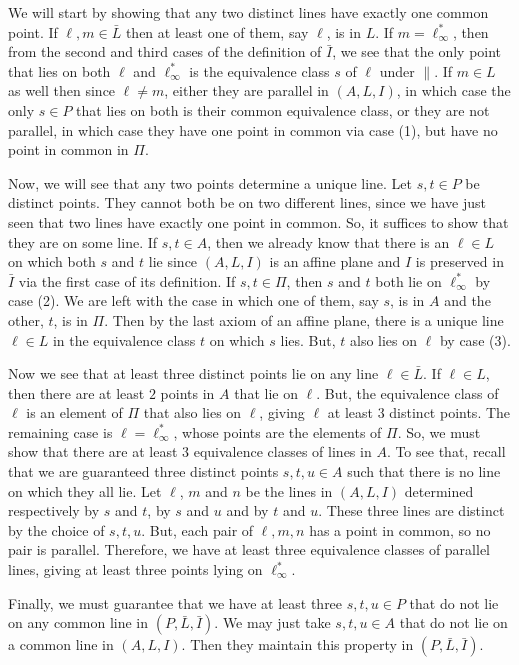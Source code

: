 \documentclass[main.tex]{subfiles}
\begin{document}
We will start by showing that any two distinct lines have exactly one common
point. If $\ell,m\in\bar L$ then at least one of them, say $\ell$, is in $L$. If
$m=\ell^*_\infty$, then from the second and third cases of the definition of
$\bar I$, we see that the only point that lies on both $\ell$ and
$\ell^*_\infty$ is the equivalence class $s$ of $\ell$ under $\parallel$. If
$m\in L$ as well then since $\ell\ne m$, either they are parallel in $(A,L,I)$,
in which case the only $s\in P$ that lies on both is their common equivalence
class, or they are not parallel, in which case they have one point in common via
case (1), but have no point in common in $\Pi$.

Now, we will see that any two points determine a unique line. Let $s,t\in P$ be
distinct points. They cannot both be on two different lines, since we have just
seen that two lines have exactly one point in common. So, it suffices to show
that they are on some line. If $s,t\in A$, then we already  know that there is
an $\ell\in L$ on which both $s$ and $t$ lie since $(A,L,I)$ is an affine plane
and $I$ is preserved in $\bar{I}$ via the first case of its definition. If
$s,t\in\Pi$, then $s$ and $t$ both lie on $\ell^*_\infty$ by case (2). We are
left with the case in which one of them, say $s$, is in $A$ and the other, $t$,
is in $\Pi$. Then by the last axiom of an affine plane, there is a unique line
$\ell\in L$ in the equivalence class $t$ on which $s$ lies. But, $t$ also lies
on $\ell$ by case (3).

Now we see that at least three distinct points lie on any line $\ell\in\bar L$.
If $\ell\in L$, then there are at least $2$ points in $A$ that lie on $\ell$.
But, the equivalence class of $\ell$ is an element of $\Pi$ that also lies on
$\ell$, giving $\ell$ at least $3$ distinct points. The remaining case is
$\ell=\ell^*_\infty$, whose points are the elements of $\Pi$. So, we must show
that there are at least $3$ equivalence classes of lines in $A$. To see that,
recall that we are guaranteed three distinct points $s,t,u\in A$ such that there
is no line on which they all lie. Let $\ell$, $m$ and $n$ be the lines in
$(A,L,I)$ determined respectively by $s$ and $t$, by $s$ and $u$ and by $t$ and
$u$. These three lines are distinct by the choice of $s,t,u$. But, each pair of
$\ell,m,n$ has a point in common, so no pair is parallel. Therefore, we have at
least three equivalence classes of parallel lines, giving at least three points
lying on $\ell^*_\infty$.

Finally, we must guarantee that we have at least three $s,t,u\in P$ that do not
lie on any common line in $(P,\bar L,\bar I)$. We may just take $s,t,u\in A$
that do not lie on a common line in $(A,L,I)$.  Then they maintain this property
in $(P,\bar L,\bar I)$.
\end{document}
